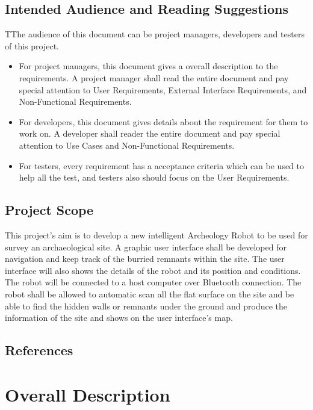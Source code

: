 \documentclass[11pt, a4paper]{report}
\begin{document}
\section{Intended Audience and Reading Suggestions}
TThe audience of this document can be project managers, developers and testers of this project. 
\begin{itemize}
\item For project managers, this document gives a overall description to the requirements. A project manager shall read the entire document and pay special attention to User Requirements, External Interface Requirements, and Non-Functional Requirements.
\item For developers, this document gives details about the requirement for them to work on. A developer shall reader the entire document and pay special attention to Use Cases and Non-Functional Requirements. 
\item For testers, every requirement has a acceptance criteria which can be used to help all the test, and testers also should focus on the User Requirements. 
\end{itemize}


\section{Project Scope}
This project's aim is to develop a new intelligent Archeology Robot to be used for survey an archaeological site. A graphic user interface shall be developed for navigation and keep track of the burried remnants within the site. The user interface will also shows the details of the robot and its position and conditions. The robot will be connected to a host computer over Bluetooth connection. The robot shall be allowed to automatic scan all the flat surface on the site and be able to find the hidden walls or remnants under the ground and produce the information of the site and shows on the user interface's map. 



\section{References}


\pagebreak



\chapter{Overall Description}
\end{document}
